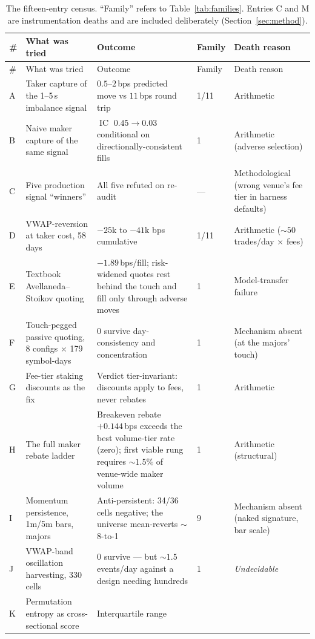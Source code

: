 \documentclass[11pt,a4paper]{article}
\DeclareMathOperator{\IC}{IC}
\newcommand{\toprule}{\hline\hline}
\newcommand{\midrule}{\hline}
\begin{document}
{\small
\begin{longtable}{p{0.5cm} p{5.2cm} p{3.8cm} p{1.4cm} p{2.9cm}}
\caption{The fifteen-entry census. ``Family'' refers to
Table~\ref{tab:families}. Entries C and M are instrumentation deaths
and are included deliberately (Section~\ref{sec:method}).}
\label{tab:census}\\
\toprule
\# & What was tried & Outcome & Family & Death reason \\
\midrule
\endfirsthead
\toprule
\# & What was tried & Outcome & Family & Death reason \\
\midrule
\endhead
A & Taker capture of the 1--5\,s imbalance signal & $0.5$--$2$\,bps
predicted move vs $11$\,bps round trip & 1/11 & Arithmetic \\
B & Naive maker capture of the same signal & $\IC$ $0.45 \to 0.03$
conditional on directionally-consistent fills & 1 & Arithmetic (adverse
selection) \\
C & Five production signal ``winners'' & All five refuted on re-audit
& --- & Methodological (wrong venue's fee tier in harness defaults) \\
D & VWAP-reversion at taker cost, 58 days & $-25$k to $-41$k bps
cumulative & 1/11 & Arithmetic (${\sim}50$ trades/day $\times$ fees) \\
E & Textbook Avellaneda--Stoikov quoting & $-1.89$\,bps/fill;
risk-widened quotes rest behind the touch and fill only through
adverse moves & 1 & Model-transfer failure \\
F & Touch-pegged passive quoting, 8 configs $\times$ 179
symbol-days & 0 survive day-consistency and concentration & 1 &
Mechanism absent (at the majors' touch) \\
G & Fee-tier staking discounts as the fix & Verdict tier-invariant:
discounts apply to fees, never rebates & 1 & Arithmetic \\
H & The full maker rebate ladder & Breakeven rebate $+0.144$\,bps
exceeds the best volume-tier rate (zero); first viable rung requires
${\sim}1.5\%$ of venue-wide maker volume & 1 & Arithmetic
(structural) \\
I & Momentum persistence, 1m/5m bars, majors & Anti-persistent: 34/36
cells negative; the universe mean-reverts ${\sim}$8-to-1 & 9 &
Mechanism absent (naked signature, bar scale) \\
J & VWAP-band oscillation harvesting, 330 cells & 0 survive --- but
${\sim}1.5$ events/day against a design needing hundreds & 1 &
\emph{Undecidable} \\
K & Permutation entropy as cross-sectional score & Interquartile range

\end{longtable}}
\end{document}
